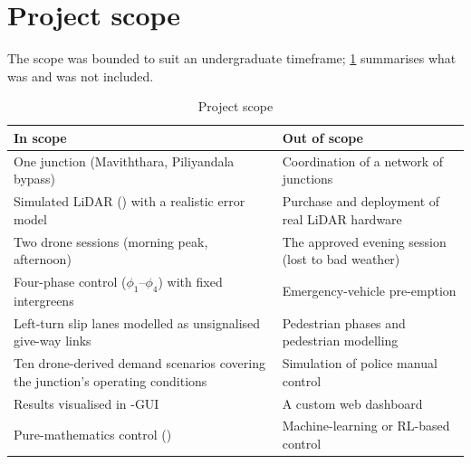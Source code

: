 \section{Project scope}\label{sec:intro-scope}

The scope was bounded to suit an undergraduate timeframe; \cref{tab:intro-scope} summarises what was and was not included.

\begin{table}[htbp]
  \centering
  \caption{Project scope}
  \label{tab:intro-scope}
  \small
  \renewcommand{\arraystretch}{1.15}
  \begin{tabularx}{\textwidth}{@{}X X@{}}
    \toprule
    \textbf{In scope} & \textbf{Out of scope} \\
    \midrule
    One junction (Maviththara, Piliyandala bypass) & Coordination of a network of junctions \\
    Simulated LiDAR (\vls{}) with a realistic error model & Purchase and deployment of real LiDAR hardware \\
    Two drone sessions (morning peak, afternoon) & The approved evening session (lost to bad weather) \\
    Four-phase control ($\phi_1$--$\phi_4$) with fixed intergreens & Emergency-vehicle pre-emption \\
    Left-turn slip lanes modelled as unsignalised give-way links & Pedestrian phases and pedestrian modelling \\
    Ten drone-derived demand scenarios covering the junction's operating conditions & Simulation of police manual control \\
    Results visualised in \sumo{}-GUI & A custom web dashboard \\
    Pure-mathematics control (\prism{}) & Machine-learning or RL-based control \\
    \bottomrule
  \end{tabularx}
\end{table}

